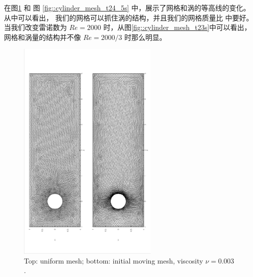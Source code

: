       在图\ref{fig::cylinder_initial_mesh} 和 图 \ref{fig::cylinder_mesh_t24_5s} 中，展示了网格和涡的等高线的变化。从中可以看出，
      我们的网格可以抓住涡的结构，并且我们的网格质量比 \cite{cao1999anr}中要好。
      当我们改变雷诺数为 $Re = 2000$ 时，从图\ref{fig::cylinder_mesh_t23s}中可以看出，网格和涡量的结构并不像 $Re = 2000/3$ 时那么明显。

      \begin{figure}[!htbp]
        \centering
        \includegraphics[width = 0.6\textwidth, angle = -90]{picture/first/obstacle_flow_data/initial_mesh.eps}
        \caption{\small Top: uniform mesh; bottom: initial
          moving mesh, viscosity $\nu = 0.003$.}
        \label{fig::cylinder_initial_mesh}
      \end{figure}

